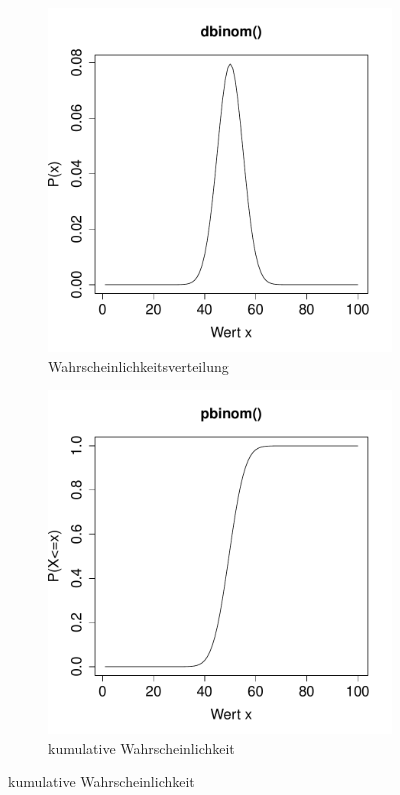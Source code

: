 \begin{figure}[h!]
\centering
\begin{subfigure}[b]{0.48\textwidth}
\includegraphics{verteilungen-018}
\caption{Wahrscheinlichkeitsverteilung}
\end{subfigure}
\begin{subfigure}[b]{0.48\textwidth}
\includegraphics{verteilungen-019}
\caption{kumulative Wahrscheinlichkeit}
\end{subfigure}


\end{figure}

